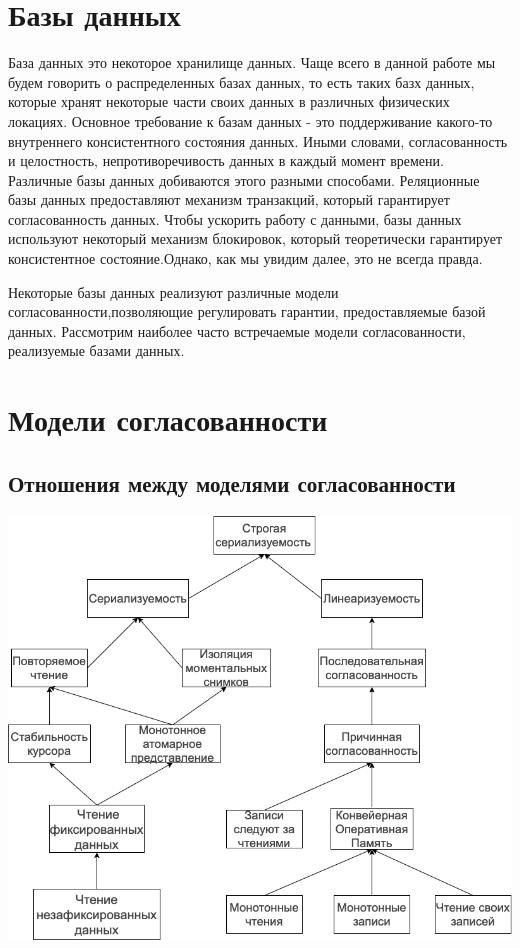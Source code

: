 \documentclass[12pt,  openany]{book}
\begin{document}
\section{Базы данных}
База данных это некоторое хранилище данных.  Чаще всего в данной работе мы будем говорить о распределенных базах данных, то есть таких базх данных,  которые хранят некоторые части своих данных в различных физических локациях.
Основное требование к базам данных - это поддерживание какого-то внутреннего консистентного состояния данных. Иными словами, согласованность и целостность, непротиворечивость данных в каждый момент времени.
Различные базы данных добиваются этого разными способами. Реляционные базы данных предоставляют механизм транзакций, который гарантирует согласованность данных.
Чтобы ускорить работу с данными, базы данных используют некоторый механизм блокировок, который теоретически гарантирует консистентное состояние.Однако, как мы увидим далее, это не всегда правда.
\par
Некоторые базы данных реализуют различные модели согласованности,позволяющие регулировать гарантии, предоставляемые базой данных. Рассмотрим наиболее часто встречаемые модели согласованности, реализуемые базами данных.
\section{Модели согласованности \cite{jepsenConsistencyModels}}
\subsection{Отношения между моделями согласованности}
\includegraphics[scale=0.5]{model-consistency.png}
\end{document}

